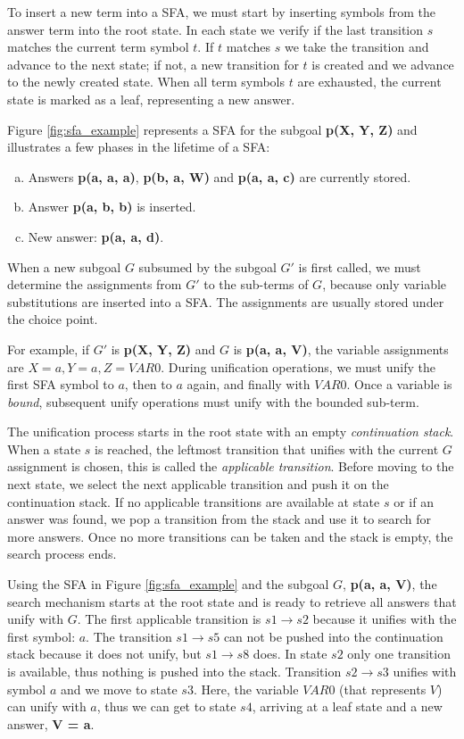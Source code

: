   To insert a new term into a SFA, we must start by inserting symbols from the answer term into the root state.
  In each state we verify if the last transition $s$ matches the current term symbol $t$. If $t$ matches $s$
  we take the transition and advance to the next state; if not, a new transition for $t$ is created and we advance
  to the newly created state. When all term symbols $t$ are exhausted, the current state is marked as a leaf,
  representing a new answer.
  
  Figure \ref{fig:sfa_example} represents a SFA for the subgoal \textbf{p(X, Y, Z)} and
  illustrates a few phases in the lifetime of a SFA:
  
  \begin{enumerate}[(a)]
    \item Answers \textbf{p(a, a, a)}, \textbf{p(b, a, W)} and \textbf{p(a, a, c)} are currently stored.
    \item Answer \textbf{p(a, b, b)} is inserted.
    \item New answer: \textbf{p(a, a, d)}.
  \end{enumerate}
  
  When a new subgoal $G$ subsumed by the subgoal $G'$ is first called, we must determine the assignments
  from $G'$ to the sub-terms of $G$, because only variable substitutions are inserted into a SFA.
  The assignments are usually stored under the choice point.
  
  For example, if $G'$ is \textbf{p(X, Y, Z)} and $G$ is \textbf{p(a, a, V)}, the variable assignments
  are $X = a, Y = a, Z = VAR0$. During unification operations, we must unify the first SFA symbol
  to $a$, then to $a$ again, and finally with $VAR0$.
  Once a variable is \textit{bound}, subsequent unify operations must unify with the bounded sub-term.
  
  The unification process starts in the root state with an empty \textit{continuation stack}.
  When a state $s$ is reached, the leftmost transition that unifies with the current $G$ assignment is chosen,
  this is called the \textit{applicable transition}.
  Before moving to the next state, we select the next applicable transition and push it on the continuation stack.
  If no applicable transitions are available at state $s$ or if an answer was found, we pop a transition from
  the stack and use it to search for more answers. Once no more transitions can be taken and the stack is empty, the
  search process ends.
  
  Using the SFA in Figure \ref{fig:sfa_example} and the subgoal $G$, \textbf{p(a, a, V)}, the search mechanism starts
  at the root state and is ready to retrieve all answers that unify with $G$.
  The first applicable transition is $s1 \rightarrow s2$ because it unifies with the first symbol: $a$. The transition
  $s1 \rightarrow s5$ can not be pushed into the continuation stack because it does not unify, but $s1 \rightarrow s8$ does.
  In state $s2$ only one transition is available, thus nothing is pushed into the stack.
  Transition $s2 \rightarrow s3$ unifies with symbol $a$ and we move to state $s3$. Here, the variable $VAR0$ (that represents $V$)
  can unify with $a$, thus we can get to state $s4$, arriving at a leaf state and a new answer, \textbf{V = a}.
  
